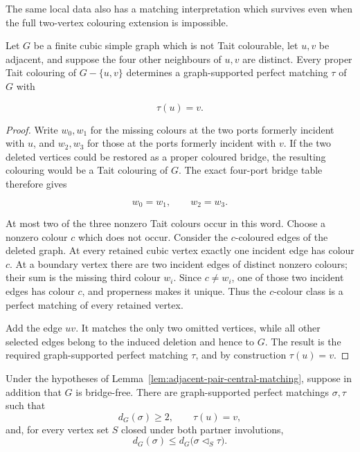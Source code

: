 The same local data also has a matching interpretation which survives even
when the full two-vertex colouring extension is impossible.

\begin{lemma}
\label{lem:adjacent-pair-central-matching}
Let \(G\) be a finite cubic simple graph which is not Tait colourable, let
\(u,v\) be adjacent, and suppose the four other neighbours of \(u,v\) are
distinct.  Every proper Tait colouring of \(G-\{u,v\}\) determines a
graph-supported perfect matching \(\tau\) of \(G\) with

\[
                              \tau(u)=v.
\]
\end{lemma}

\begin{proof}
Write \(w_0,w_1\) for the missing colours at the two ports formerly incident
with \(u\), and \(w_2,w_3\) for those at the ports formerly incident with
\(v\).  If the two deleted vertices could be restored as a proper coloured
bridge, the resulting colouring would be a Tait colouring of \(G\).  The
exact four-port bridge table therefore gives

\[
                         w_0=w_1,\qquad w_2=w_3.
\]

At most two of the three nonzero Tait colours occur in this word.  Choose a
nonzero colour \(c\) which does not occur.  Consider the \(c\)-coloured edges
of the deleted graph.  At every retained cubic vertex exactly one incident
edge has colour \(c\).  At a boundary vertex there are two incident edges of
distinct nonzero colours; their sum is the missing third colour \(w_i\).
Since \(c\ne w_i\), one of those two incident edges has colour \(c\), and
properness makes it unique.  Thus the \(c\)-colour class is a perfect
matching of every retained vertex.

Add the edge \(uv\).  It matches the only two omitted vertices, while all
other selected edges belong to the induced deletion and hence to \(G\).
The result is the required graph-supported perfect matching \(\tau\), and by
construction \(\tau(u)=v\).
\end{proof}

\begin{corollary}
\label{cor:adjacent-pair-rigid-exchange-input}
Under the hypotheses of Lemma~\ref{lem:adjacent-pair-central-matching}, suppose
in addition that \(G\) is bridge-free.  There are graph-supported perfect
matchings \(\sigma,\tau\) such that
\[
 d_G(\sigma)\geq2,
 \qquad \tau(u)=v,
\]
and, for every vertex set \(S\) closed under both partner involutions,
\[
 d_G(\sigma)
 \leq d_G\bigl(\sigma\mathbin\triangleleft_S\tau\bigr).
\]
\end{corollary}

